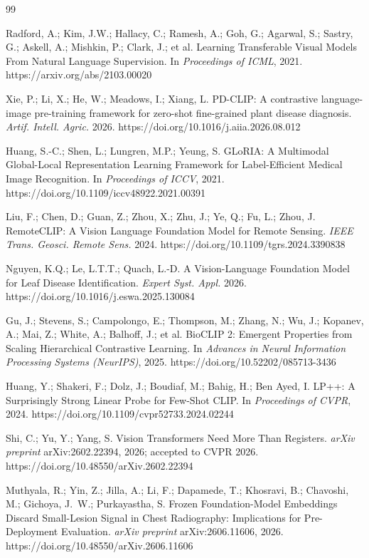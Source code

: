 \documentclass[10pt,a4paper]{article}
\begin{document}
\begin{thebibliography}{99}

Radford, A.; Kim, J.W.; Hallacy, C.; Ramesh, A.; Goh, G.; Agarwal, S.; Sastry, G.; Askell, A.; Mishkin, P.; Clark, J.; et al.
Learning Transferable Visual Models From Natural Language Supervision.
In \emph{Proceedings of ICML}, 2021.
https://arxiv.org/abs/2103.00020

 Xie, P.; Li, X.; He, W.; Meadows, I.; Xiang, L.
 PD-CLIP: A contrastive language-image pre-training framework for zero-shot fine-grained plant disease diagnosis.
 \emph{Artif. Intell. Agric.} 2026.
 https://doi.org/10.1016/j.aiia.2026.08.012

Huang, S.-C.; Shen, L.; Lungren, M.P.; Yeung, S.
GLoRIA: A Multimodal Global-Local Representation Learning Framework for Label-Efficient Medical Image Recognition.
In \emph{Proceedings of ICCV}, 2021.
https://doi.org/10.1109/iccv48922.2021.00391

Liu, F.; Chen, D.; Guan, Z.; Zhou, X.; Zhu, J.; Ye, Q.; Fu, L.; Zhou, J.
RemoteCLIP: A Vision Language Foundation Model for Remote Sensing.
\emph{IEEE Trans. Geosci. Remote Sens.} 2024.
https://doi.org/10.1109/tgrs.2024.3390838

Nguyen, K.Q.; Le, L.T.T.; Quach, L.-D.
A Vision-Language Foundation Model for Leaf Disease Identification.
\emph{Expert Syst. Appl.} 2026.
https://doi.org/10.1016/j.eswa.2025.130084

Gu, J.; Stevens, S.; Campolongo, E.; Thompson, M.; Zhang, N.; Wu, J.; Kopanev, A.; Mai, Z.; White, A.; Balhoff, J.; et al.
BioCLIP 2: Emergent Properties from Scaling Hierarchical Contrastive Learning.
In \emph{Advances in Neural Information Processing Systems (NeurIPS)}, 2025.
https://doi.org/10.52202/085713-3436

Huang, Y.; Shakeri, F.; Dolz, J.; Boudiaf, M.; Bahig, H.; Ben Ayed, I.
LP++: A Surprisingly Strong Linear Probe for Few-Shot CLIP.
In \emph{Proceedings of CVPR}, 2024.
https://doi.org/10.1109/cvpr52733.2024.02244

Shi, C.; Yu, Y.; Yang, S.
Vision Transformers Need More Than Registers.
\emph{arXiv preprint} arXiv:2602.22394, 2026; accepted to CVPR 2026.
https://doi.org/10.48550/arXiv.2602.22394

Muthyala, R.; Yin, Z.; Jilla, A.; Li, F.; Dapamede, T.; Khosravi, B.; Chavoshi, M.; Gichoya, J.~W.; Purkayastha, S.
Frozen Foundation-Model Embeddings Discard Small-Lesion Signal in Chest Radiography: Implications for Pre-Deployment Evaluation.
\emph{arXiv preprint} arXiv:2606.11606, 2026.
https://doi.org/10.48550/arXiv.2606.11606


\end{thebibliography}
\end{document}
